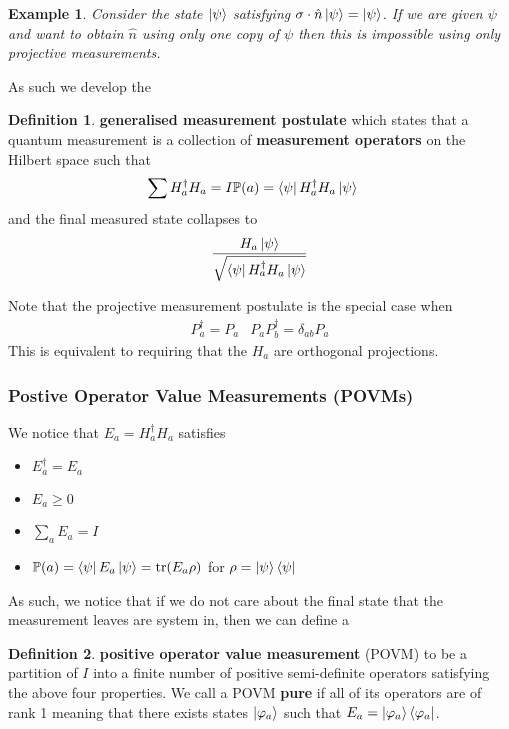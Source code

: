 \documentclass{article}
\newtheorem{example}{Example}
\theoremstyle{definition}
\newtheorem{definition}{Definition}
\begin{document}
\begin{example}
  Consider the state $\ket\psi$ satisfying $\sigma \cdot \hat{n} \ket\psi = 
  \ket \psi$. If we are given $\psi$ and want to obtain $\hat n$ using only
  one copy of $\psi$ then this is impossible using only projective 
  measurements.
\end{example}

As such we develop the

\begin{definition}
  \textbf{generalised measurement postulate} which states that a quantum 
  measurement is a collection of \textbf{measurement operators} on the Hilbert
  space such that
  \begin{align}
    \sum H_a^\dagger H_a = I & \mathbb{P}(a) = \bra \psi H_a^\dagger H_a \ket 
    \psi
  \end{align}
  and the final measured state collapses to
  \begin{equation}
    \frac{H_a \ket \psi}{\sqrt{\bra \psi H_a^\dagger H_a \ket \psi}}
  \end{equation}
\end{definition}

Note that the projective measurement postulate is the special case when
\begin{align}
  P_a^\dagger = P_a & P_a P_b^\dagger = \delta_{ab} P_a
\end{align}
This is equivalent to requiring that the $H_a$ are orthogonal projections.

\subsubsection{Postive Operator Value Measurements (POVMs)}

We notice that $E_a = H_a^\dagger H_a$ satisfies

\begin{itemize}
  \item $E_a^\dagger = E_a$
  \item $E_a \geq 0$
  \item $\sum_a E_a = I$
  \item $\mathbb{P}(a) = \bra\psi E_a \ket\psi = \tr(E_a \rho)$ for 
    $\rho = \ket \psi \bra \psi$
\end{itemize}

As such, we notice that if we do not care about the final state that the 
measurement leaves are system in, then we can define a
\begin{definition}
  \textbf{positive operator value measurement} (POVM) 
  to be a partition of $I$ into
  a finite number of positive semi-definite operators satisfying the above four
  properties. We call a POVM \textbf{pure} if all of its operators are of rank
  1 meaning that there exists states $\ket{\varphi_a}$ such that $E_a = 
  \ket{\varphi_a} \bra{\varphi_a}$.
\end{definition}
\end{document}
